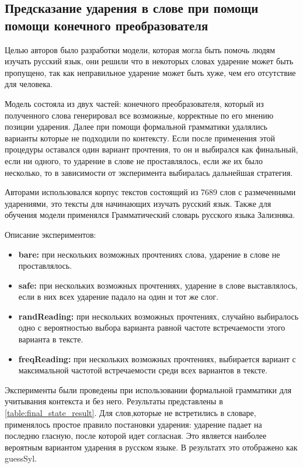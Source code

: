\documentclass[14pt, a4paper, russian]{report}
\begin{document}
\begin{normalsize}
\section{Предсказание ударения в слове при помощи помощи конечного преобразователя}

Целью авторов\cite{reynolds} было разработки модели, которая могла быть помочь людям изучать русский язык, они решили что в некоторых словах ударение может быть пропущено, так как неправильное ударение может быть хуже, чем его отсутствие для человека.

Модель состояла из двух частей: конечного преобразователя\cite{koskenniemi, karttunen}, который из полученного слова генерировал все возможные, корректные по его мнению позиции ударения. Далее при помощи формальной грамматики\cite{karlsson} удалялись варианты которые не подходили по контексту. Если после применения этой процедуры оставался один вариант прочтения, то он и выбирался как финальный, если ни одного, то ударение в слове не проставлялось, если же их было несколько, то в зависимости от эксперимента выбиралась дальнейшая стратегия. 

Авторами использовался корпус текстов состоящий из 7689 слов с размеченными ударениями, это тексты для начинающих изучать русский язык. Также для обучения модели применялся Грамматический словарь русского языка Зализняка\cite{zaliz}. 

Описание экспериментов:
\begin{itemize}
	\item \textbf{bare:} при нескольких возможных прочтениях  слова, ударение в слове не проставлялось.
	\item \textbf{safe:}  при нескольких возможных прочтениях, ударение в слове выставлялось, если в них всех ударение падало на один и тот же слог.
	\item \textbf{randReading:} при нескольких возможных прочтениях, случайно выбиралось одно с вероятностью выбора варианта равной частоте встречаемости этого варианта в тексте.
	
	\item \textbf{freqReading:} при нескольких возможных прочтениях, выбирается вариант с максимальной  частотой встречаемости среди всех  вариантов в тексте.
\end{itemize}


Эксперименты были проведены при использовании формальной грамматики для учитывания контекста и без него. Результаты представлены в \cref{table:final_state_result}. Для слов,которые не встретились в словаре, применялось простое правило постановки ударения: ударение падает на последню гласную, после которой идет согласная. Это является наиболее вероятным вариантом ударения в русском языке\cite{lavitskaya}. В результатх это отображено как guessSyl.


\end{normalsize}
\end{document}
